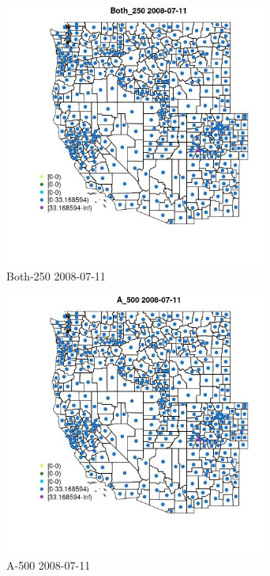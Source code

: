 \begin{figure} 
\centering  
\includegraphics[width=0.77\textwidth]{Code_Outputs/df_report_ML_predictors_CountyCentroid_Locations_Dates_2008-01-01to2018-12-31_MapObsBoth_2502008-07-11.jpg} 
\caption{\label{fig:df_report_ML_predictors_CountyCentroid_Locations_Dates_2008-01-01to2018-12-31MapObsBoth_2502008-07-11}Both-250 2008-07-11} 
\end{figure} 
 

\begin{figure} 
\centering  
\includegraphics[width=0.77\textwidth]{Code_Outputs/df_report_ML_predictors_CountyCentroid_Locations_Dates_2008-01-01to2018-12-31_MapObsA_5002008-07-11.jpg} 
\caption{\label{fig:df_report_ML_predictors_CountyCentroid_Locations_Dates_2008-01-01to2018-12-31MapObsA_5002008-07-11}A-500 2008-07-11} 
\end{figure} 
 


